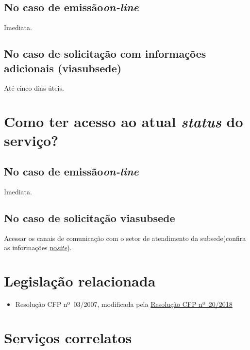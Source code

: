 \subsection{\texorpdfstring{No caso de emissão\emph{on-line}}{No caso de emissão on-line}}

Imediata.

\subsection{No caso de solicitação com informações adicionais (viasubsede)}

Até cinco dias úteis.

\section{Como ter acesso ao atual \emph{status} do serviço?}

\subsection{\texorpdfstring{No caso de emissão\emph{on-line}}{No caso de emissão on-line}}

Imediata.

\subsection{No caso de solicitação viasubsede}

Acessar os canais de comunicação com o setor de atendimento da subsede(confira as informações \href{https://www.crpsp.org/sede/index}{no\emph{site}}).

\section{Legislação relacionada}

\begin{itemize}
  \item  Resolução CFP nº~03/2007, modificada pela  \href{https://atosoficiais.com.br/cfp/resolucao-administrativa-financeira-n-20-2018-altera-o-manual-de-procedimentos-administrativo-e-financeiro-do-sistema-conselhos-de-psicologia-anexo-da-resolucao-cfp-n-202018-a-resolucao-cfp-n-03-2007-a-resolucao-cfp-n-16-2019-e-da-outras-providencias}{Resolução  CFP nº~20/2018}
\end{itemize}

\section{Serviços correlatos}

